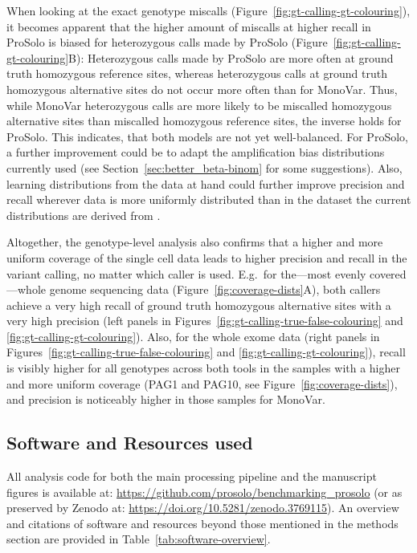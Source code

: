 \documentclass[authoryear,preprint,11pt]{scrartcl}
\begin{document}
When looking at the exact genotype miscalls (Figure~\ref{fig:gt-calling-gt-colouring}), it becomes apparent that the higher amount of miscalls at higher recall in ProSolo is biased for heterozygous calls made by ProSolo (Figure~\ref{fig:gt-calling-gt-colouring}B):
Heterozygous calls made by ProSolo are more often at ground truth homozygous reference sites, whereas heterozygous calls at ground truth homozygous alternative sites do not occur more often than for MonoVar.
Thus, while MonoVar heterozygous calls are more likely to be miscalled homozygous alternative sites than miscalled homozygous reference sites, the inverse holds for ProSolo.
This indicates, that both models are not yet well-balanced.
For ProSolo, a further improvement could be to adapt the amplification bias distributions currently used (see Section~\ref{sec:better_beta-binom} for some suggestions).
Also, learning distributions from the data at hand could further improve precision and recall wherever data is more uniformly distributed than in the dataset the current distributions are derived from \citep{lodato_somatic_2015}.

Altogether, the genotype-level analysis also confirms that a higher and more uniform coverage of the single cell data leads to higher precision and recall in the variant calling, no matter which caller is used.
E.g.~for the---most evenly covered---whole genome sequencing data (Figure~\ref{fig:coverage-dists}A), both callers achieve a very high recall of ground truth homozygous alternative sites with a very high precision (left panels in Figures~\ref{fig:gt-calling-true-false-colouring} and \ref{fig:gt-calling-gt-colouring}).
Also, for the whole exome data (right panels in Figures~\ref{fig:gt-calling-true-false-colouring} and \ref{fig:gt-calling-gt-colouring}), recall is visibly higher for all genotypes across both tools in the samples with a higher and more uniform coverage (PAG1 and PAG10, see Figure~\ref{fig:coverage-dists}), and precision is noticeably higher in those samples for MonoVar.

\subsection{Software and Resources used}

All analysis code for both the main processing pipeline and the manuscript figures is available at: \url{https://github.com/prosolo/benchmarking_prosolo} (or as preserved by Zenodo at: \url{https://doi.org/10.5281/zenodo.3769115}).
An overview and citations of software and resources beyond those mentioned in the methods section are provided in Table~\ref{tab:software-overview}.
\end{document}
